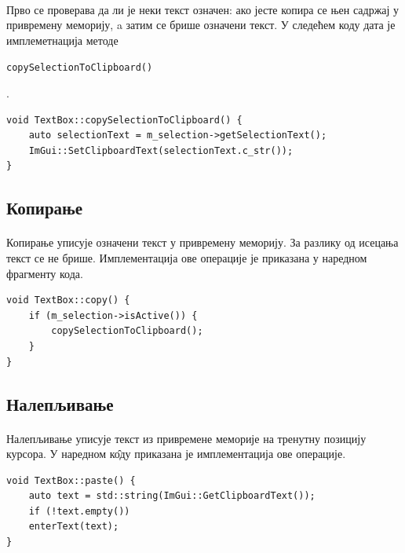 \documentclass[12pt,oneside]{memoir}
\begin{document}
\paragraph{}
Прво се проверава да ли је неки текст означен: ако јесте копира се њен садржај у
привремену меморију, a затим се брише означени текст. У следећем коду дата је имплеметнација
методе \begin{latinica}\verb|copySelectionToClipboard()|\end{latinica}.

\begin{verbatim}
void TextBox::copySelectionToClipboard() {
	auto selectionText = m_selection->getSelectionText();
	ImGui::SetClipboardText(selectionText.c_str());
}
\end{verbatim}

\subsection{Копирање}
\paragraph{}
Копирање уписује означени текст у привремену меморију. За разлику од исецања текст 
се не брише. Имплементација ове операције је приказана у наредном фрагменту кода.

\begin{verbatim}
void TextBox::copy() {
	if (m_selection->isActive()) {
		copySelectionToClipboard();
	}
}
\end{verbatim}

\subsection{Налепљивање}
\paragraph{}
Налепљивање уписује текст из привремене меморије на тренутну позицију курсора. 
У наредном к\^{о}ду приказана је имплементација ове операције.

\begin{verbatim}
void TextBox::paste() {
	auto text = std::string(ImGui::GetClipboardText());
	if (!text.empty())
	enterText(text);
}
\end{verbatim}


\end{document}
